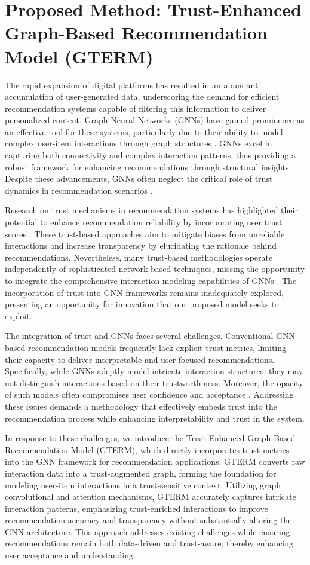 \section{Proposed Method: Trust-Enhanced Graph-Based Recommendation Model (GTERM)}
The rapid expansion of digital platforms has resulted in an abundant accumulation of user-generated data, underscoring the demand for efficient recommendation systems capable of filtering this information to deliver personalized content. Graph Neural Networks (GNNs) have gained prominence as an effective tool for these systems, particularly due to their ability to model complex user-item interactions through graph structures \cite{wu2019neural, kipf2017semi}. GNNs excel in capturing both connectivity and complex interaction patterns, thus providing a robust framework for enhancing recommendations through structural insights. Despite these advancements, GNNs often neglect the critical role of trust dynamics in recommendation scenarios \cite{velickovic2018graph}.

Research on trust mechanisms in recommendation systems has highlighted their potential to enhance recommendation reliability by incorporating user trust scores \cite{massa2007trust, guo2017trust}. These trust-based approaches aim to mitigate biases from unreliable interactions and increase transparency by elucidating the rationale behind recommendations. Nevertheless, many trust-based methodologies operate independently of sophisticated network-based techniques, missing the opportunity to integrate the comprehensive interaction modeling capabilities of GNNs \cite{konstas2009social, ma2011recommender}. The incorporation of trust into GNN frameworks remains inadequately explored, presenting an opportunity for innovation that our proposed model seeks to exploit.

The integration of trust and GNNs faces several challenges. Conventional GNN-based recommendation models frequently lack explicit trust metrics, limiting their capacity to deliver interpretable and user-focused recommendations. Specifically, while GNNs adeptly model intricate interaction structures, they may not distinguish interactions based on their trustworthiness. Moreover, the opacity of such models often compromises user confidence and acceptance \cite{zhang2014explicit}. Addressing these issues demands a methodology that effectively embeds trust into the recommendation process while enhancing interpretability and trust in the system.

In response to these challenges, we introduce the Trust-Enhanced Graph-Based Recommendation Model (GTERM), which directly incorporates trust metrics into the GNN framework for recommendation applications. GTERM converts raw interaction data into a trust-augmented graph, forming the foundation for modeling user-item interactions in a trust-sensitive context. Utilizing graph convolutional and attention mechanisms, GTERM accurately captures intricate interaction patterns, emphasizing trust-enriched interactions to improve recommendation accuracy and transparency without substantially altering the GNN architecture. This approach addresses existing challenges while ensuring recommendations remain both data-driven and trust-aware, thereby enhancing user acceptance and understanding.

